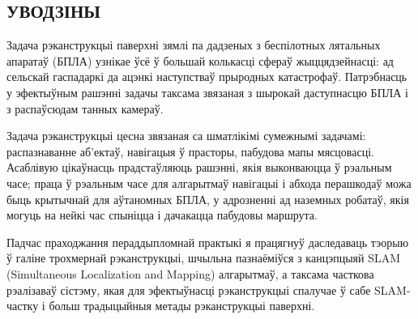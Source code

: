 \begin{center}
    \section*{УВОДЗІНЫ}
\end{center}

Задача рэканструкцыі паверхні зямлі па дадзеных з беспілотных лятальных апаратаў
(БПЛА) узнікае ўсё ў большай колькасці сфераў жыццядзейнасці: ад сельскай гаспадаркі да
ацэнкі наступстваў прыродных катастрофаў. Патрэбнасць у эфектыўным рашэнні
задачы таксама звязаная з шырокай даступнасцю БПЛА і з распаўсюдам танных камераў.

Задача рэканструкцыі цесна звязаная са шматлікімі сумежнымі задачамі:
распазнаванне аб'ектаў, навігацыя ў прасторы, пабудова мапы мясцовасці.
Асаблівую цікаўнасць прадстаўляюць рашэнні, якія выконваюцца ў рэальным часе;
праца ў рэальным часе для алгарытмаў навігацыі і абхода перашкодаў можа быць крытычнай для
аўтаномных БПЛА, у адрозненні ад наземных робатаў, якія могуць на нейкі час спыніцца і
дачакацца пабудовы маршрута.

Падчас праходжання пераддыпломнай практыкі я працягнуў даследаваць тэорыю ў галіне
трохмернай рэканструкцыі, шчыльна пазнаёміўся з канцэпцыяй SLAM (Simultaneous
Localization and Mapping) алгарытмаў, а таксама часткова рэалізаваў сістэму, якая
для эфектыўнасці рэканструкцыі спалучае ў сабе SLAM-частку і больш
традыцыйныя метады рэканструкцыі паверхні.

\newpage

